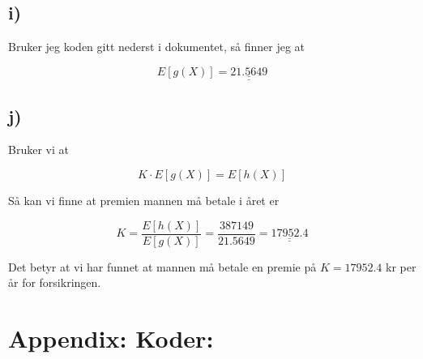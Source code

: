 \documentclass[a4paper,norsk, 10pt]{article}
\begin{document}
\subsection*{i)}

Bruker jeg koden gitt nederst i dokumentet, så finner jeg at

$$
E[g(X)] = \underline{\underline{21.5649}}
$$

\subsection*{j)}

Bruker vi at 

$$
K\cdot E[g(X)] = E[h(X)]
$$

Så kan vi finne at premien mannen må betale i året er 

$$
K = \frac{E[h(X)]}{E[g(X)]} = \frac{387149}{21.5649} = \underline{\underline{17952.4}}
$$

Det betyr at vi har funnet at mannen må betale en premie på $K = 17952.4$ kr per år for forsikringen.

\newpage

\section*{Appendix: Koder:}


\end{document}
